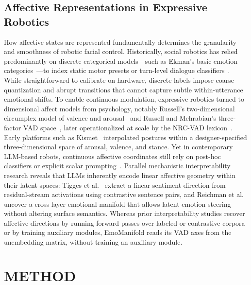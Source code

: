 \documentclass[letterpaper, 10 pt, conference]{ieeeconf/ieeeconf}
\begin{document}
\subsection{Affective Representations in Expressive Robotics}
How affective states are represented fundamentally determines the granularity and smoothness of robotic facial control. Historically, social robotics has relied predominantly on discrete categorical models---such as Ekman's basic emotion categories~\cite{ekman1978facs}---to index static motor presets or turn-level dialogue classifiers~\cite{mishra2023realtime,cherakara2023furchat,kang2024nadine}. While straightforward to calibrate on hardware, discrete labels impose coarse quantization and abrupt transitions that cannot capture subtle within-utterance emotional shifts. To enable continuous modulation, expressive robotics turned to dimensional affect models from psychology, notably Russell's two-dimensional circumplex model of valence and arousal~\cite{russell1980circumplex} and Russell and Mehrabian's three-factor VAD space~\cite{russell1977evidence}, later operationalized at scale by the NRC-VAD lexicon~\cite{mohammad2018nrcvad}. Early platforms such as Kismet~\cite{breazeal2002designing} interpolated postures within a designer-specified three-dimensional space of arousal, valence, and stance. Yet in contemporary LLM-based robots, continuous affective coordinates still rely on post-hoc classifiers or explicit scalar prompting~\cite{antony2025xpress}. Parallel mechanistic interpretability research reveals that LLMs inherently encode linear affective geometry within their latent spaces: Tigges et al.~\cite{tigges2024sentiment} extract a linear sentiment direction from residual-stream activations using contrastive sentence pairs, and Reichman et al.~\cite{reichman2026emotions} uncover a cross-layer emotional manifold that allows latent emotion steering without altering surface semantics. Whereas prior interpretability studies recover affective directions by running forward passes over labeled or contrastive corpora or by training auxiliary modules, EmoManifold reads its VAD axes from the unembedding matrix, without training an auxiliary module.

\section{METHOD}
\label{sec:method}
\end{document}
